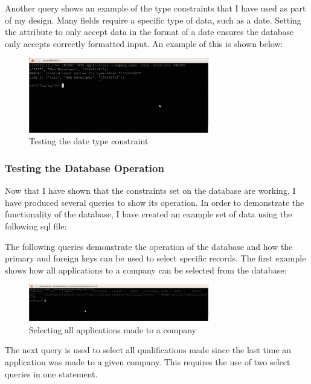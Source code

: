 \documentclass{article}
\begin{document}
Another query shows an example of the type constraints that I have used as part of my design. Many fields require a specific type of data, such as a date. Setting the attribute to only accept data in the format of a date ensures the database only accepts correctly formatted input. An example of this is shown below:

\begin{figure}[H]
\centering
\includegraphics[width=0.7\textwidth]{img/test/test-date.png}
\caption{Testing the date type constraint}
\label{fig:test-date}
\end{figure}

\subsubsection{Testing the Database Operation}
Now that I have shown that the constraints set on the database are working, I have produced several queries to show its operation. In order to demonstrate the functionality of the database, I have created an example set of data using the following sql file:



The following queries demonstrate the operation of the database and how the primary and foreign keys can be used to select specific records. The first example shows how all applications to a company can be selected from the database:

\begin{figure}[H]
\centering
\includegraphics[width=0.7\textwidth]{img/test/test-qapp.png}
\caption{Selecting all applications made to a company}
\label{fig:test-qapp}
\end{figure}

The next query is used to select all qualifications made since the last time an application was made to a given company. This requires the use of two select queries in one statement.
\end{document}
